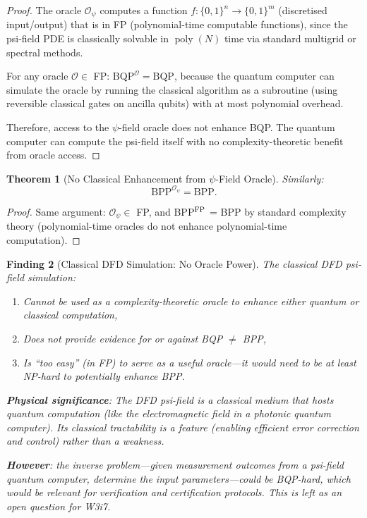 \documentclass[11pt]{article}
\newtheorem{theorem}{Theorem}[section]
\newtheorem{finding}[theorem]{Finding}
\theoremstyle{definition}
\theoremstyle{remark}
\DeclareMathOperator{\poly}{poly}
\begin{document}
\begin{proof}
The oracle $\mathcal{O}_\psi$ computes a function $f: \{0,1\}^n \to
\{0,1\}^m$ (discretised input/output) that is in FP (polynomial-time
computable functions), since the psi-field PDE is classically solvable
in $\poly(N)$ time via standard multigrid or spectral methods.

For any oracle $\mathcal{O} \in$ FP:
$\mathrm{BQP}^{\mathcal{O}} = \mathrm{BQP}$, because the quantum
computer can simulate the oracle by running the classical algorithm
as a subroutine (using reversible classical gates on ancilla qubits)
with at most polynomial overhead.

Therefore, access to the $\psi$-field oracle does not enhance BQP.
The quantum computer can compute the psi-field itself with no
complexity-theoretic benefit from oracle access.
\end{proof}

\begin{theorem}[No Classical Enhancement from $\psi$-Field Oracle]
\label{thm:classical-no-enhancement}
Similarly:
\begin{equation}
  \mathrm{BPP}^{\mathcal{O}_\psi} = \mathrm{BPP}.
\end{equation}
\end{theorem}

\begin{proof}
Same argument: $\mathcal{O}_\psi \in$ FP, and BPP$^{\rm FP}$ = BPP
by standard complexity theory (polynomial-time oracles do not enhance
polynomial-time computation).
\end{proof}

\begin{finding}[Classical DFD Simulation: No Oracle Power]
\label{finding:no-oracle-power}
The classical DFD psi-field simulation:
\begin{enumerate}[nosep]
  \item Cannot be used as a complexity-theoretic oracle to enhance
    either quantum or classical computation,
  \item Does not provide evidence for or against BQP $\neq$ BPP,
  \item Is ``too easy'' (in FP) to serve as a useful oracle---it
    would need to be at least NP-hard to potentially enhance BPP.
\end{enumerate}

\textbf{Physical significance}: The DFD psi-field is a classical medium
that hosts quantum computation (like the electromagnetic field in a
photonic quantum computer).  Its classical tractability is a \emph{feature}
(enabling efficient error correction and control) rather than a
weakness.

\textbf{However}: the \emph{inverse problem}---given measurement outcomes
from a psi-field quantum computer, determine the input parameters---could
be BQP-hard, which would be relevant for verification and certification
protocols.  This is left as an open question for W3i7.
\end{finding}
\end{document}
